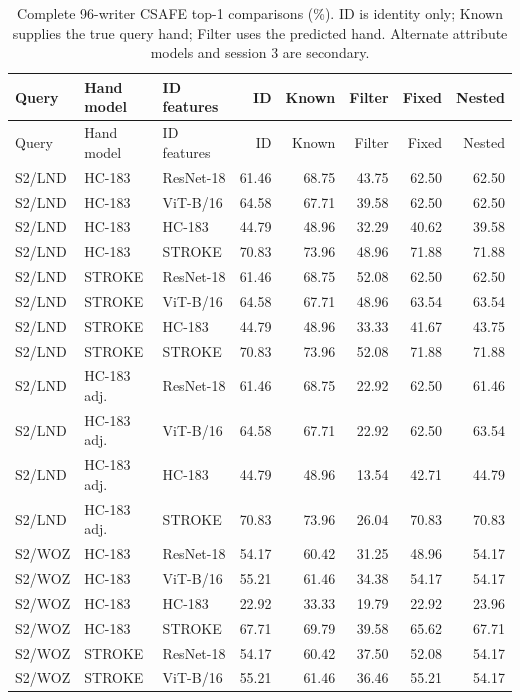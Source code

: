 \documentclass[10pt,a4paper]{article}
\begin{document}
\begin{longtable}{lllrrrrr}
\caption{Complete 96-writer CSAFE top-1 comparisons (\%). ID is identity only; Known supplies the true query hand; Filter uses the predicted hand. Alternate attribute models and session 3 are secondary.}\label{tab:csafefull}\\
\toprule Query & Hand model & ID features & ID & Known & Filter & Fixed & Nested\\\midrule
\endfirsthead
\toprule Query & Hand model & ID features & ID & Known & Filter & Fixed & Nested\\\midrule
\endhead
S2/LND & HC-183 & ResNet-18 & 61.46 & 68.75 & 43.75 & 62.50 & 62.50 \\
S2/LND & HC-183 & ViT-B/16 & 64.58 & 67.71 & 39.58 & 62.50 & 62.50 \\
S2/LND & HC-183 & HC-183 & 44.79 & 48.96 & 32.29 & 40.62 & 39.58 \\
S2/LND & HC-183 & STROKE & 70.83 & 73.96 & 48.96 & 71.88 & 71.88 \\
S2/LND & STROKE & ResNet-18 & 61.46 & 68.75 & 52.08 & 62.50 & 62.50 \\
S2/LND & STROKE & ViT-B/16 & 64.58 & 67.71 & 48.96 & 63.54 & 63.54 \\
S2/LND & STROKE & HC-183 & 44.79 & 48.96 & 33.33 & 41.67 & 43.75 \\
S2/LND & STROKE & STROKE & 70.83 & 73.96 & 52.08 & 71.88 & 71.88 \\
S2/LND & HC-183 adj. & ResNet-18 & 61.46 & 68.75 & 22.92 & 62.50 & 61.46 \\
S2/LND & HC-183 adj. & ViT-B/16 & 64.58 & 67.71 & 22.92 & 62.50 & 63.54 \\
S2/LND & HC-183 adj. & HC-183 & 44.79 & 48.96 & 13.54 & 42.71 & 44.79 \\
S2/LND & HC-183 adj. & STROKE & 70.83 & 73.96 & 26.04 & 70.83 & 70.83 \\
S2/WOZ & HC-183 & ResNet-18 & 54.17 & 60.42 & 31.25 & 48.96 & 54.17 \\
S2/WOZ & HC-183 & ViT-B/16 & 55.21 & 61.46 & 34.38 & 54.17 & 54.17 \\
S2/WOZ & HC-183 & HC-183 & 22.92 & 33.33 & 19.79 & 22.92 & 23.96 \\
S2/WOZ & HC-183 & STROKE & 67.71 & 69.79 & 39.58 & 65.62 & 67.71 \\
S2/WOZ & STROKE & ResNet-18 & 54.17 & 60.42 & 37.50 & 52.08 & 54.17 \\
S2/WOZ & STROKE & ViT-B/16 & 55.21 & 61.46 & 36.46 & 55.21 & 54.17 \\

\end{longtable}
\end{document}
